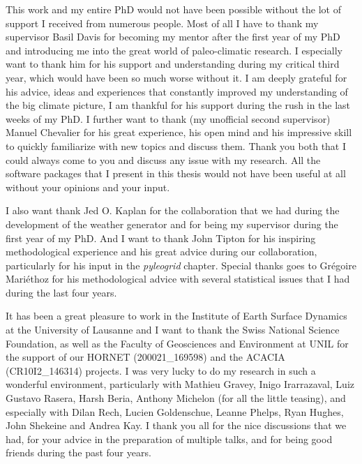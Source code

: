 \begin{acknowledgements}
\addchaptertocentry{\acknowledgementname} %
This work and my entire PhD would not have been possible without the lot of support I received from numerous people. Most of all I have to thank my supervisor Basil Davis for becoming my mentor after the first year of my PhD and introducing me into the great world of paleo-climatic research. I especially want to thank him for his support and understanding during my critical third year, which would have been so much worse without it. I am deeply grateful for his advice, ideas and experiences that constantly improved my understanding of the big climate picture, I am thankful for his support during the rush in the last weeks of my PhD. I further want to thank (my unofficial second supervisor) Manuel Chevalier for his great experience, his open mind and his impressive skill to quickly familiarize with new topics and discuss them. Thank you both that I could always come to you and discuss any issue with my research. All the software packages that I present in this thesis would not have been useful at all without your opinions and your input.

I also want thank Jed O. Kaplan for the collaboration that we had during the development of the weather generator and for being my supervisor during the first year of my PhD. And I want to thank John Tipton for his inspiring methodological experience and his great advice during our collaboration, particularly for his input in the \textit{pyleogrid} chapter. Special thanks goes to Grégoire Mariéthoz for his methodological advice with several statistical issues that I had during the last four years.

 It has been a great pleasure to work in the Institute of Earth Surface Dynamics at the University of Lausanne and I want to thank the Swiss National Science Foundation, as well as the Faculty of Geosciences and Environment at UNIL for the support of our HORNET (200021\_169598) and the ACACIA (CR10I2\_146314) projects. I was very lucky to do my research in such a wonderful environment, particularly with Mathieu Gravey, Inigo Irarrazaval, Luiz Gustavo Rasera, Harsh Beria, Anthony Michelon (for all the little teasing), and especially with Dilan Rech, Lucien Goldenschue, Leanne Phelps, Ryan Hughes, John Shekeine and Andrea Kay. I thank you all for the nice discussions that we had, for your advice in the preparation of multiple talks, and for being good friends during the past four years.
 

\end{acknowledgements}
